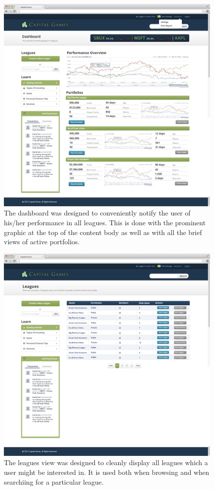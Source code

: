 \begin{figure}
\centering
\includegraphics[width=5.5in]{./mockups/JPEG/dashboard.jpg}
\caption{The dashboard was designed to conveniently notify the user of his/her performance in all leagues. This is done with the prominent graphic at the top of the content body as well as with all the brief views of active portfolios.}
\end{figure}

\begin{figure}
\centering
\includegraphics[width=5.5in]{./mockups/JPEG/leagues.jpg}
\caption{The leagues view was designed to cleanly display all leagues which a user might be interested in. It is used both when browsing and when searchiing for a particular league.}
\end{figure}

